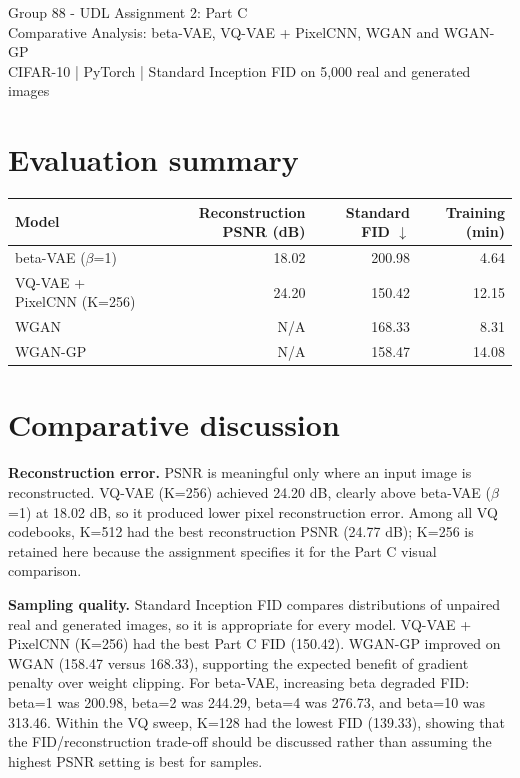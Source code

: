 \documentclass[11pt]{article}
\begin{document}
\begin{center}
{\LARGE Group 88 - UDL Assignment 2: Part C}\\[3pt]
{\large Comparative Analysis: beta-VAE, VQ-VAE + PixelCNN, WGAN and WGAN-GP}\\[6pt]
CIFAR-10 | PyTorch | Standard Inception FID on 5,000 real and generated images
\end{center}

\section*{Evaluation summary}
\begin{center}
\begin{tabular}{lrrr}
\toprule
Model & Reconstruction PSNR (dB) & Standard FID $\downarrow$ & Training (min)\\
\midrule
beta-VAE ($\beta$=1) & 18.02 & 200.98 & 4.64\\
VQ-VAE + PixelCNN (K=256) & 24.20 & 150.42 & 12.15\\
WGAN & N/A & 168.33 & 8.31\\
WGAN-GP & N/A & 158.47 & 14.08\\
\bottomrule
\end{tabular}
\end{center}

\section*{Comparative discussion}
\textbf{Reconstruction error.} PSNR is meaningful only where an input image is reconstructed. VQ-VAE (K=256) achieved 24.20 dB, clearly above beta-VAE ($\beta$=1) at 18.02 dB, so it produced lower pixel reconstruction error. Among all VQ codebooks, K=512 had the best reconstruction PSNR (24.77 dB); K=256 is retained here because the assignment specifies it for the Part C visual comparison.

\textbf{Sampling quality.} Standard Inception FID compares distributions of unpaired real and generated images, so it is appropriate for every model. VQ-VAE + PixelCNN (K=256) had the best Part C FID (150.42). WGAN-GP improved on WGAN (158.47 versus 168.33), supporting the expected benefit of gradient penalty over weight clipping. For beta-VAE, increasing beta degraded FID: beta=1 was 200.98, beta=2 was 244.29, beta=4 was 276.73, and beta=10 was 313.46. Within the VQ sweep, K=128 had the lowest FID (139.33), showing that the FID/reconstruction trade-off should be discussed rather than assuming the highest PSNR setting is best for samples.
\end{document}
